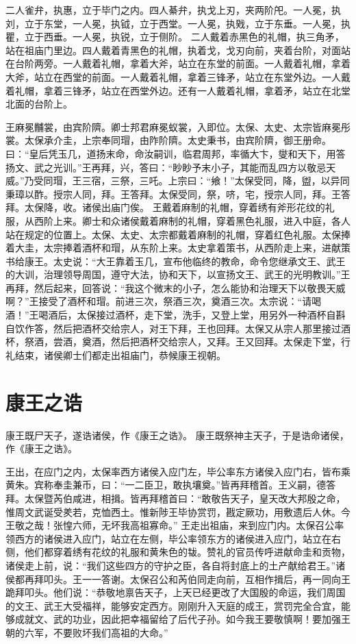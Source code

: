 \documentclass[a4paper,12pt,UTF8,twoside]{ctexbook}
\begin{document}
二人雀弁，执惠，立于毕门之内。四人綦弁，执戈上刃，夹两阶戺。一人冕，执刘，立于东堂，一人冕，执钺，立于西堂。一人冕，执戣，立于东垂。一人冕，执瞿，立于西垂。一人冕，执锐，立于侧阶。
二人戴着赤黑色的礼帽，执三角矛，站在祖庙门里边。四人戴着青黑色的礼帽，执着戈，戈刃向前，夹着台阶，对面站在台阶两旁。一人戴着礼帽，拿着大斧，站立在东堂的前面。一人戴着礼帽，拿着大斧，站立在西堂的前面。一人戴着礼帽，拿着三锋矛，站立在东堂外边。一人戴着礼帽，拿着三锋矛，站立在西堂外边。还有一人戴着礼帽，拿着矛，站立在北堂北面的台阶上。

王麻冕黼裳，由宾阶隮。卿士邦君麻冕蚁裳，入即位。太保、太史、太宗皆麻冕彤裳。太保承介圭，上宗奉同瑁，由阼阶隮。太史秉书，由宾阶隮，御王册命。曰：“皇后凭玉几，道扬末命，命汝嗣训，临君周邦，率循大卞，燮和天下，用答扬文、武之光训。”王再拜，兴，答曰：“眇眇予末小子，其能而乱四方以敬忌天威。”乃受同瑁，王三宿，三祭，三吒。上宗曰：“飨！”太保受同，降，盥，以异同秉璋以酢。授宗人同，拜。王答拜。太保受同，祭，哜，宅，授宗人同，拜。王答拜。太保降，收。诸侯出庙门俟。
王戴着麻制的礼帽，穿着绣有斧形花纹的礼服，从西阶上来。卿士和众诸侯戴着麻制的礼帽，穿着黑色礼服，进入中庭，各人站在规定的位置上。太保、太史、太宗都戴着麻制的礼帽，穿着红色礼服。太保捧着大圭，太宗捧着酒杯和瑁，从东阶上来。太史拿着策书，从西阶走上来，进献策书给康王。太史说：“大王靠着玉几，宣布他临终的教命，命令您继承文王、武王的大训，治理领导周国，遵守大法，协和天下，以宣扬文王、武王的光明教训。”王再拜，然后起来，回答说：“我这个微末的小子，怎么能协和治理天下以敬畏天威啊？”王接受了酒杯和瑁。前进三次，祭酒三次，奠酒三次。太宗说：“请喝酒！”王喝酒后，太保接过酒杯，走下堂，洗手，又登上堂，用另外一种酒杯自斟自饮作答，然后把酒杯交给宗人，对王下拜，王也回拜。太保又从宗人那里接过酒杯，祭酒，尝酒，奠酒，然后把酒杯交给宗人，又拜。王又回拜。太保走下堂，行礼结束，诸侯卿士们都走出祖庙门，恭候康王视朝。

\chapter{康王之诰}

康王既尸天子，遂诰诸侯，作《康王之诰》。
康王既祭神主天子，于是诰命诸侯，作《康王之诰》。

王出，在应门之内，太保率西方诸侯入应门左，毕公率东方诸侯入应门右，皆布乘黄朱。宾称奉圭兼币，曰：“一二臣卫，敢执壤奠。”皆再拜稽首。王义嗣，德答拜。太保暨芮伯咸进，相揖。皆再拜稽首曰：“敢敬告天子，皇天改大邦殷之命，惟周文武诞受羑若，克恤西土。惟新陟王毕协赏罚，戡定厥功，用敷遗后人休。今王敬之哉！张惶六师，无坏我高祖寡命。”
王走出祖庙，来到应门内。太保召公率领西方的诸侯进入应门，站立在左侧，毕公率领东方的诸侯进入应门，站立在右侧，他们都穿着绣有花纹的礼服和黄朱色的韨。赞礼的官员传呼进献命圭和贡物，诸侯走上前，说：“我们这些四方的守护之臣，各自将封底上的土产献给君王。”诸侯都再拜叩头。王一一答谢。太保召公和芮伯同走向前，互相作揖后，再一同向王跪拜叩头。他们说：“恭敬地禀告天子，上天已经更改了大国殷的命运，我们周国的文王、武王大受福祥，能够安定西方。刚刚升入天庭的成王，赏罚完全合宜，能够成就文、武的功业，因此把幸福留给了后代子孙。如今我王要敬慎啊！要加强王朝的六军，不要败坏我们高祖的大命。”
\end{document}
